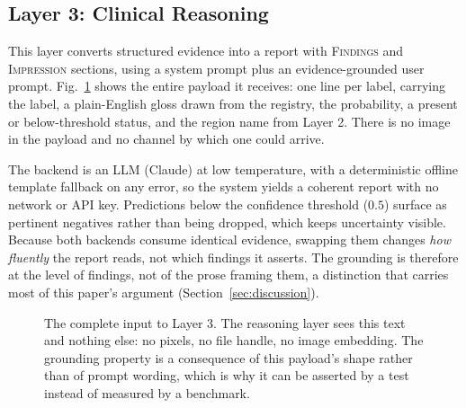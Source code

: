 \documentclass[conference]{IEEEtran}
\begin{document}
\subsection{Layer 3: Clinical Reasoning}
This layer converts structured evidence into a report with \textsc{Findings} and
\textsc{Impression} sections, using a system prompt plus an evidence-grounded user
prompt. Fig.~\ref{fig:evidence} shows the entire payload it receives: one line per
label, carrying the label, a plain-English gloss drawn from the registry, the
probability, a present or below-threshold status, and the region name from Layer 2.
There is no image in the payload and no channel by which one could arrive.

The backend is an LLM (Claude) at low temperature, with a deterministic offline
template fallback on any error, so the system yields a coherent report with no
network or API key. Predictions below the confidence threshold ($0.5$) surface as
pertinent negatives rather than being dropped, which keeps uncertainty visible.
Because both backends consume identical evidence, swapping them changes \emph{how
fluently} the report reads, not which findings it asserts. The grounding is
therefore at the level of findings, not of the prose framing them, a distinction
that carries most of this paper's argument (Section~\ref{sec:discussion}).

\begin{figure}[tbp]
\centering
{}
\caption{The complete input to Layer 3. The reasoning layer sees this text and
nothing else: no pixels, no file handle, no image embedding. The grounding
property is a consequence of this payload's shape rather than of prompt wording,
which is why it can be asserted by a test instead of measured by a benchmark.}
\label{fig:evidence}
\end{figure}
\end{document}
